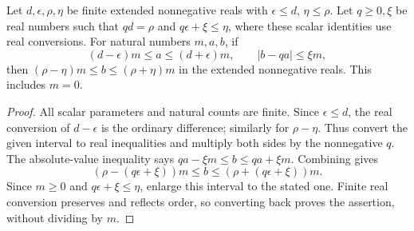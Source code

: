 \begin{lemma}
Let $d,\epsilon,\rho,\eta$ be finite extended nonnegative reals with
$\epsilon\leq d$, $\eta\leq\rho$. Let $q\geq0,\xi$ be real numbers
such that $qd=\rho$ and $q\epsilon+\xi\leq\eta$, where these scalar
identities use real conversions. For natural numbers $m,a,b$, if
\[
(d-\epsilon)m\leq a\leq(d+\epsilon)m,
\qquad |b-qa|\leq\xi m,
\]
then $(\rho-\eta)m\leq b\leq(\rho+\eta)m$ in the extended
nonnegative reals. This includes $m=0$.
\end{lemma}
\begin{proof}
All scalar parameters and natural counts are finite. Since
$\epsilon\leq d$, the real conversion of $d-\epsilon$ is the ordinary
difference; similarly for $\rho-\eta$. Thus convert the given interval
to real inequalities and multiply both sides by the nonnegative $q$.
The absolute-value inequality says $qa-\xi m\leq b\leq qa+\xi m$.
Combining gives
\[
(\rho-(q\epsilon+\xi))m\leq b
\leq(\rho+(q\epsilon+\xi))m.
\]
Since $m\geq0$ and $q\epsilon+\xi\leq\eta$, enlarge this interval
to the stated one. Finite real conversion preserves and reflects order,
so converting back proves the assertion, without dividing by $m$.
\end{proof}
